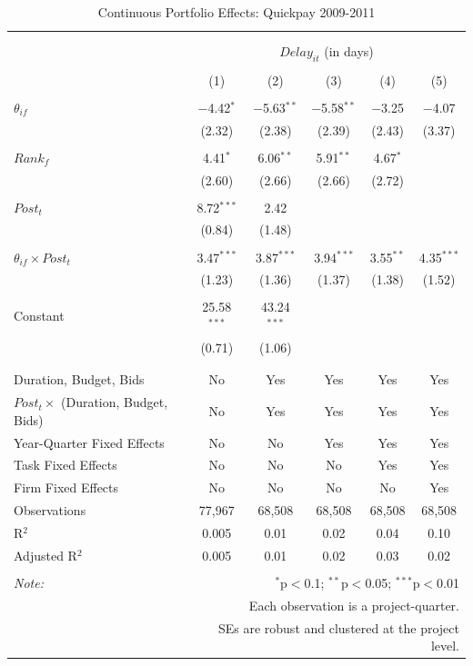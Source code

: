 \documentclass[
]{article}
\begin{document}
\begin{table}[H] \centering 
  \caption{Continuous Portfolio Effects: Quickpay 2009-2011} 
  \label{} 
\small 
\begin{tabular}{@{\extracolsep{-2pt}}lccccc} 
\\[-1.8ex]\hline 
\hline \\[-1.8ex] 
\\[-1.8ex] & \multicolumn{5}{c}{$Delay_{it}$ (in days)} \\ 
\\[-1.8ex] & (1) & (2) & (3) & (4) & (5)\\ 
\hline \\[-1.8ex] 
 $\theta_{if}$ & $-$4.42$^{*}$ & $-$5.63$^{**}$ & $-$5.58$^{**}$ & $-$3.25 & $-$4.07 \\ 
  & (2.32) & (2.38) & (2.39) & (2.43) & (3.37) \\ 
  & & & & & \\ 
 $Rank_f$ & 4.41$^{*}$ & 6.06$^{**}$ & 5.91$^{**}$ & 4.67$^{*}$ &  \\ 
  & (2.60) & (2.66) & (2.66) & (2.72) &  \\ 
  & & & & & \\ 
 $Post_t$ & 8.72$^{***}$ & 2.42 &  &  &  \\ 
  & (0.84) & (1.48) &  &  &  \\ 
  & & & & & \\ 
 $\theta_{if} \times Post_t$ & 3.47$^{***}$ & 3.87$^{***}$ & 3.94$^{***}$ & 3.55$^{**}$ & 4.35$^{***}$ \\ 
  & (1.23) & (1.36) & (1.37) & (1.38) & (1.52) \\ 
  & & & & & \\ 
 Constant & 25.58$^{***}$ & 43.24$^{***}$ &  &  &  \\ 
  & (0.71) & (1.06) &  &  &  \\ 
  & & & & & \\ 
\hline \\[-1.8ex] 
Duration, Budget, Bids & No & Yes & Yes & Yes & Yes \\ 
$Post_t \times$  (Duration, Budget, Bids) & No & Yes & Yes & Yes & Yes \\ 
Year-Quarter Fixed Effects & No & No & Yes & Yes & Yes \\ 
Task Fixed Effects & No & No & No & Yes & Yes \\ 
Firm Fixed Effects & No & No & No & No & Yes \\ 
Observations & 77,967 & 68,508 & 68,508 & 68,508 & 68,508 \\ 
R$^{2}$ & 0.005 & 0.01 & 0.02 & 0.04 & 0.10 \\ 
Adjusted R$^{2}$ & 0.005 & 0.01 & 0.02 & 0.03 & 0.02 \\ 
\hline 
\hline \\[-1.8ex] 
\textit{Note:}  & \multicolumn{5}{r}{$^{*}$p$<$0.1; $^{**}$p$<$0.05; $^{***}$p$<$0.01} \\ 
 & \multicolumn{5}{r}{Each observation is a project-quarter.} \\ 
 & \multicolumn{5}{r}{SEs are robust and clustered at the project level.} \\ 
\end{tabular} 
\end{table}
\end{document}
